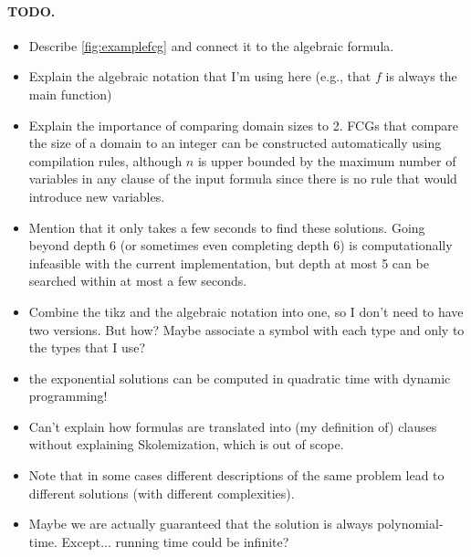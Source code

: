 \documentclass{article}
\theoremstyle{definition}
\theoremstyle{remark}
\begin{document}
\paragraph{TODO.}
\begin{itemize}
\item Describe \cref{fig:examplefcg} and connect it to the algebraic formula.
\item Explain the algebraic notation that I'm using here (e.g., that $f$ is always the main function)
\item Explain the importance of comparing domain sizes to 2. FCGs that compare the size of a domain to an integer can be constructed automatically using compilation rules, although $n$ is upper bounded by the maximum number of variables in any clause of the input formula since there is no rule that would introduce new variables.
\item Mention that it only takes a few seconds to find these solutions. Going beyond depth 6 (or sometimes even completing depth 6) is computationally infeasible with the current implementation, but depth at most 5 can be searched within at most a few seconds.
\item Combine the tikz and the algebraic notation into one, so I don't need to have two versions. But how? Maybe associate a symbol with each type and only to the types that I use?
\item the exponential solutions can be computed in quadratic time with dynamic programming!
\item Can't explain how formulas are translated into (my definition of) clauses without explaining Skolemization, which is out of scope.
\item Note that in some cases different descriptions of the same problem lead to different solutions (with different complexities).
\item Maybe we are actually guaranteed that the solution is always polynomial-time. Except... running time could be infinite?
\end{itemize}
\end{document}
